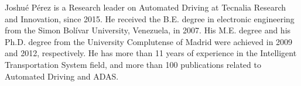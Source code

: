 \documentclass[journal]{IEEEtran}
\begin{document}
\begin{IEEEbiography}
    {Joshu\'e P\'erez} is a Research leader on Automated Driving at Tecnalia 
    Research and Innovation, since 2015. He received the B.E. degree in 
    electronic engineering from the Simon Bolívar University, Venezuela, in 
    2007. His M.E. degree and his Ph.D. degree from the University Complutense 
    of Madrid were achieved in 2009 and 2012, respectively. He has more than 11 
    years of experience in the Intelligent Transportation System field, and 
    more than 100 publications related to Automated Driving and ADAS. 
\end{IEEEbiography}




\vfill




\end{document}
